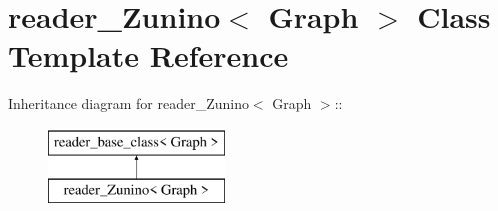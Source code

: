 \hypertarget{classreader__Zunino}{
\section{reader\_\-Zunino$<$ Graph $>$ Class Template Reference}
\label{classreader__Zunino}
}
Inheritance diagram for reader\_\-Zunino$<$ Graph $>$::\begin{figure}[H]
\begin{center}
\leavevmode
\includegraphics[height=2cm]{classreader__Zunino}
\end{center}
\end{figure}
